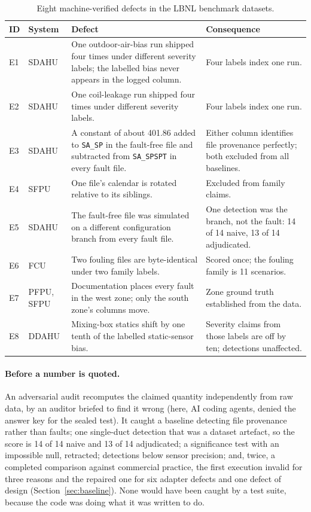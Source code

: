\documentclass[11pt,letterpaper]{article}
\begin{document}
\begin{table}[htbp]
\centering
\caption{Eight machine-verified defects in the LBNL benchmark datasets.}
\label{tab:errata}
\footnotesize
\setlength{\tabcolsep}{4pt}
\begin{tabular}{@{}>{\raggedright\arraybackslash}p{}>{\raggedright\arraybackslash}p{}>{\raggedright\arraybackslash}p{}>{\raggedright\arraybackslash}p{}@{}}
\hline
ID & System & Defect & Consequence \\
\hline
E1 & SDAHU & One outdoor-air-bias run shipped four times under different severity labels; the labelled bias never appears in the logged column. & Four labels index one run. \\
E2 & SDAHU & One coil-leakage run shipped four times under different severity labels. & Four labels index one run. \\
E3 & SDAHU & A constant of about 401.86 added to \texttt{SA\_SP} in the fault-free file and subtracted from \texttt{SA\_SPSPT} in every fault file. & Either column identifies file provenance perfectly; both excluded from all baselines. \\
E4 & SFPU & One file's calendar is rotated relative to its siblings. & Excluded from family claims. \\
E5 & SDAHU & The fault-free file was simulated on a different configuration branch from every fault file. & One detection was the branch, not the fault: 14 of 14 naive, 13 of 14 adjudicated. \\
E6 & FCU & Two fouling files are byte-identical under two family labels. & Scored once; the fouling family is 11 scenarios. \\
E7 & PFPU, SFPU & Documentation places every fault in the west zone; only the south zone's columns move. & Zone ground truth established from the data. \\
E8 & DDAHU & Mixing-box statics shift by one tenth of the labelled static-sensor bias. & Severity claims from those labels are off by ten; detections unaffected. \\
\hline
\end{tabular}

\end{table}


\paragraph{Before a number is quoted.} An adversarial audit recomputes the claimed quantity independently from raw data, by an auditor briefed to find it wrong (here, AI coding agents, denied the answer key for the sealed test). It caught a baseline detecting file provenance rather than faults; one single-duct detection that was a dataset artefact, so the score is 14 of 14 naive and 13 of 14 adjudicated; a significance test with an impossible null, retracted; detections below sensor precision; and, twice, a completed comparison against commercial practice, the first execution invalid for three reasons and the repaired one for six adapter defects and one defect of design (Section~\ref{sec:baseline}). None would have been caught by a test suite, because the code was doing what it was written to do.
\end{document}
